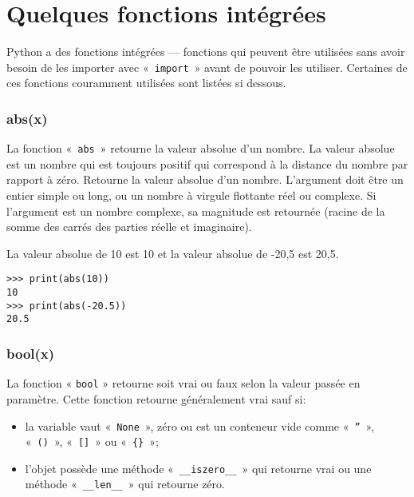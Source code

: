 



\chapter{Quelques fonctions intégrées}\label{app:fonctionsintégrées}

Python a des fonctions intégrées --- fonctions qui peuvent être utilisées sans avoir besoin de les importer avec «~\texttt{import}~»  avant de pouvoir les utiliser. Certaines de ces fonctions couramment  utilisées sont listées si dessous.

\subsection*{abs(x)}

La fonction «~\texttt{abs}~» retourne la valeur absolue d'un nombre. La valeur absolue est un nombre qui est toujours positif qui correspond à la distance du nombre par rapport à zéro. Retourne la valeur absolue d'un nombre. L'argument doit être un entier simple ou long, ou un nombre à virgule flottante réel ou complexe. Si l'argument est un nombre complexe, sa magnitude est retournée (racine de la somme des carrés des parties réelle et imaginaire).

La valeur absolue de 10 est 10 et la valeur absolue de -20,5 est 20,5. 
\begin{Verbatim}[frame=single,rulecolor=\color{gray}]
>>> print(abs(10))
10
>>> print(abs(-20.5))
20.5
\end{Verbatim}

\subsection*{bool(x)}

La fonction « \texttt{bool} » retourne soit vrai ou faux selon la valeur passée en paramètre. Cette fonction retourne généralement vrai  sauf si:
\begin{itemize}
\item la variable vaut  «~\texttt{None}~», zéro ou est un conteneur vide comme «~\texttt{''}~», «~\texttt{()}~»,  «~\texttt{[]}~» ou «~\texttt{\{\}}~»;
\item l'objet possède une méthode «~\texttt{\_\_iszero\_\_}~» qui retourne vrai ou une méthode «~\texttt{\_\_len\_\_}~» qui retourne zéro.
\end{itemize}

